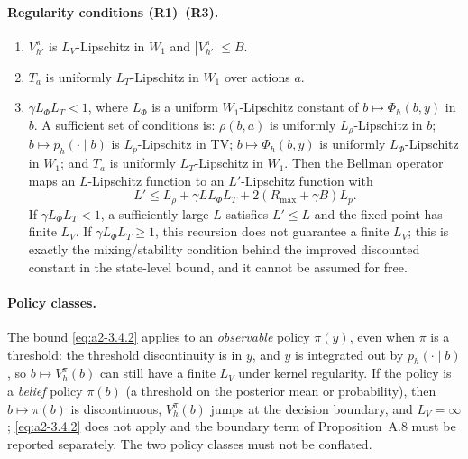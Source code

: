 \paragraph{Regularity conditions (R1)--(R3).}
\begin{enumerate}
\item[(R1)] $V_{h'}^\pi$ is $L_V$-Lipschitz in $W_1$ and $|V_{h'}^\pi|\le B$.
\item[(R2)] $T_a$ is uniformly $L_T$-Lipschitz in $W_1$ over actions $a$.
\item[(R3)] $\gamma L_\Phi L_T<1$, where $L_\Phi$ is a uniform $W_1$-Lipschitz
constant of $b\mapsto\Phi_h(b,y)$ in $b$.  A sufficient set of conditions is:
$\rho(b,a)$ is uniformly $L_\rho$-Lipschitz in $b$; $b\mapsto p_h(\cdot\mid b)$
is $L_p$-Lipschitz in TV; $b\mapsto\Phi_h(b,y)$ is uniformly $L_\Phi$-Lipschitz
in $W_1$; and $T_a$ is uniformly $L_T$-Lipschitz in $W_1$.  Then the Bellman
operator maps an $L$-Lipschitz function to an $L'$-Lipschitz function with
\[
L'\le L_\rho+\gamma L L_\Phi L_T+2(R_{\max}+\gamma B)L_p.
\]
If $\gamma L_\Phi L_T<1$, a sufficiently large $L$ satisfies $L'\le L$ and the
fixed point has finite $L_V$.  If $\gamma L_\Phi L_T\ge1$, this recursion does
not guarantee a finite $L_V$; this is exactly the mixing/stability condition
behind the improved discounted constant in the state-level bound, and it cannot
be assumed for free.
\end{enumerate}

\paragraph{Policy classes.}
The bound \eqref{eq:a2-3.4.2} applies to an \emph{observable} policy
$\pi(y)$, even when $\pi$ is a threshold: the threshold discontinuity is in
$y$, and $y$ is integrated out by $p_h(\cdot\mid b)$, so $b\mapsto V_h^\pi(b)$
can still have a finite $L_V$ under kernel regularity.  If the policy is a
\emph{belief} policy $\pi(b)$ (a threshold on the posterior mean or
probability), then $b\mapsto\pi(b)$ is discontinuous, $V_h^\pi(b)$ jumps at the
decision boundary, and $L_V=\infty$; \eqref{eq:a2-3.4.2} does not apply and the
boundary term of Proposition~A.8 must be reported separately.  The two policy
classes must not be conflated.

